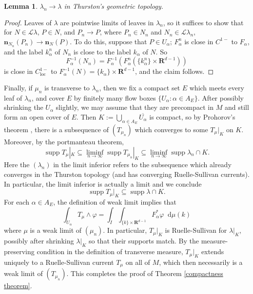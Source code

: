 \documentclass[reqno,11pt]{amsart}
\newcommand{\RR}{\mathbf{R}}
\newcommand*\dif{\mathop{}\!\mathrm{d}}
\DeclareMathOperator{\supp}{supp}
\newcommand{\Leaves}{\mathscr L}
\newcommand{\normal}{\mathbf n}
\newcommand{\loc}{\mathrm{loc}}
\newtheorem{lemma}[theorem]{Lemma}
\theoremstyle{definition}
\numberwithin{equation}{section}
\begin{document}
\begin{lemma}
	$\lambda_n \to \lambda$ in Thurston's geometric topology.
\end{lemma}
\begin{proof}
Leaves of $\lambda$ are pointwise limits of leaves in $\lambda_n$, so it suffices to show that for $N \in \Leaves \lambda$, $P \in N$, and $P_n \to P$, where $P_n \in N_n$ and $N_n \in \Leaves \lambda_n$, $\normal_{N_n}(P_n) \to \normal_N(P)$.
To do this, suppose that $P \in U_\alpha$; $F_\alpha^n$ is close in $C^{1-}$ to $F_\alpha$, and the label $k^n_\alpha$ of $N_n$ is close to the label $k_\alpha$ of $N$.
So
$$F_\alpha^{-1}(N_n) = F_\alpha^{-1}(F_\alpha^n(\{k_\alpha^n\} \times \RR^{d - 1}))$$
is close in $C^{1-}_\loc$ to $F_\alpha^{-1}(N) = \{k_\alpha\} \times \RR^{d - 1}$, and the claim follows.
\end{proof}

Finally, if $\mu_n$ is transverse to $\lambda_n$, then we fix a compact set $E$ which meets every leaf of $\lambda_n$, and cover $E$ by finitely many flow boxes $\{U_\alpha: \alpha \in A_E\}$.
After possibly shrinking the $U_\alpha$ slightly, we may assume that they are precompact in $M$ and still form an open cover of $E$.
Then $K := \bigcup_{\alpha \in A_E} \overline{U_\alpha}$ is compact, so by Prohorov's theorem \cite[Theorem 13.29]{klenke2013probability}, there is a subsequence of $(T_{\mu_n})$ which converges to some $T_\mu|_K$ on $K$.
Moreover, by the portmanteau theorem,
$$\supp T_\mu|_K \subseteq \liminf_{n \to \infty} \supp T_{\mu_n}|_K \subseteq \liminf_{n \to \infty} \supp \lambda_n \cap K.$$
Here the $(\lambda_n)$ in the limit inferior refers to the subsequence which already converges in the Thurston topology (and has converging Ruelle-Sullivan currents).
In particular, the limit inferior is actually a limit and we conclude
$$\supp T_\mu|_K \subseteq \supp \lambda \cap K.$$
For each $\alpha \in A_E$, the definition of weak limit implies that
$$\int_{U_\alpha} T_\mu \wedge \varphi = \int_I \int_{\{k\} \times \RR^{d - 1}} F_\alpha^* \varphi \dif \mu(k)$$
where $\mu$ is a weak limit of $(\mu_n)$.
In particular, $T_\mu|_K$ is Ruelle-Sullivan for $\lambda|_K$, possibly after shrinking $\lambda|_K$ so that their supports match.
By the measure-preserving condition in the definition of transverse measure, $T_\mu|_K$ extends uniquely to a Ruelle-Sullivan current $T_\mu$ on all of $M$, which then necessarily is a weak limit of $(T_{\mu_n})$.
This completes the proof of Theorem \ref{compactness theorem}.


\end{document}
